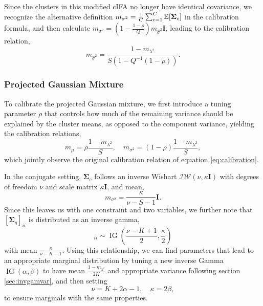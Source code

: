 \documentclass{article}
\newcommand{\noisescalesq}{\lambda^2}
\newcommand{\mean}{\mu}
\newcommand{\scale}{\sigma}
\newcommand{\scalesq}{\scale^2}
\newcommand{\subscale}{\hat{\sigma}}
\newcommand{\subscalesq}{\subscale^2}
\newcommand{\compmean}{{\mean}}
\newcommand{\compcov}{{\bm{\Sigma}}}
\newcommand{\numfactor}{S}
\newcommand{\numcluster}{C}
\newcommand{\numifa}{Q}
\newcommand{\icluster}{c}
\begin{document}
Since the clusters in this modified cIFA no longer have identical covariance, we recognize the alternative definition $m_{\scalesq}=\frac{1}{\numcluster}\sum_{c=1}^{\numcluster}\E{\compcov_c}$ in the calibration formula, and then calculate $m_{\scalesq}=(1-\frac{1-\rho}{\numifa}){m}_{\subscalesq}\bm{I}$, leading to the calibration relation,
\begin{equation}
{m}_{\subscalesq}=\frac{1-m_{\noisescalesq}}{\numfactor(1-\numifa^{-1}(1-\rho))}.
\end{equation}

\subsubsection{Projected Gaussian Mixture}
To calibrate the projected Gaussian mixture, we first introduce a tuning parameter $\rho$ that controls how much of the remaining variance should be explained by the cluster means, as opposed to the component variance, yielding the calibration relations, 
\begin{equation}
m_{\compmean}=\rho\frac{1-m_{\noisescalesq}}{\numfactor},\quad m_{\scalesq}=(1-\rho)\frac{1-m_{\noisescalesq}}{\numfactor},
\end{equation}
which jointly observe the original calibration relation of equation \eqref{eq:calibration}.

In the conjugate setting, $\compcov_\icluster$ follows an inverse Wishart $\mathcal{IW}(\nu, \kappa\bm{I})$ with degrees of freedom $\nu$ and scale matrix $\kappa\bm{I}$, and mean,
\begin{equation}
m_{\scalesq}=\frac{\kappa}{\nu - \numfactor - 1}\bm{I}.
\end{equation}
Since this leaves us with one constraint and two variables, we further note that $[\compcov_q]_{ii}$ is distributed as an inverse gamma,
\begin{equation}
[\compcov_q]_{ii}\sim \operatorname{IG}\left(\frac{\nu-K+1}{2},\frac{\kappa}{2}\right)
\end{equation}
with mean $\frac{\kappa}{\nu-K-1}$. Using this relationship, we can find parameters that lead to an appropriate marginal distribution by tuning
a new inverse Gamma $\operatorname{IG}(\alpha,\beta)$ to have mean $\frac{1-m_{\noisescalesq}}{2K}$ and appropriate variance following section \ref{sec:invgamvar}, and then setting
\begin{equation}
\nu=K+2\alpha-1,\quad \kappa=2\beta, 
\end{equation}
to ensure marginals with the same properties.
\end{document}
